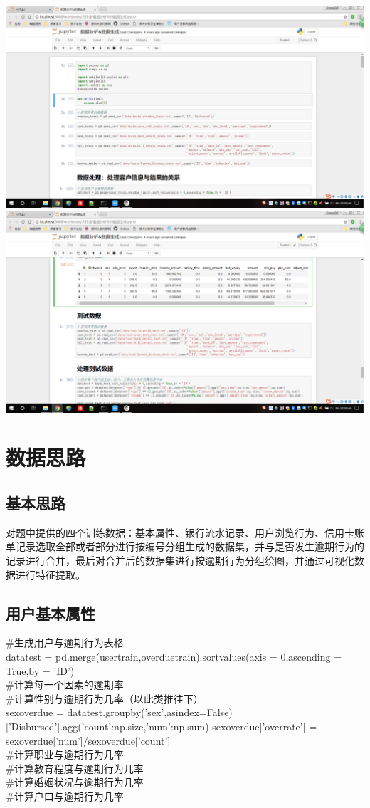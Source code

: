 \documentclass{article}
\begin{document}
\includegraphics[scale=0.3]{图一}
\includegraphics[scale=0.3]{2}

\section{数据思路}
\subsection{基本思路}
对题中提供的四个训练数据：基本属性、银行流水记录、用户浏览行为、信用卡账单记录选取全部或者部分进行按编号分组生成的数据集，并与是否发生逾期行为的记录进行合并，最后对合并后的数据集进行按逾期行为分组绘图，并通过可视化数据进行特征提取。

\subsection{用户基本属性}
\#生成用户与逾期行为表格
\\datatest = pd.merge(user\textunderscore train,overdue\textunderscore train).sort\textunderscore values(axis = 0,ascending = True,by = 'ID') 
\\ \#计算每一个因素的逾期率
\\ \#计算性别与逾期行为几率（以此类推往下）
\\ sex\textunderscore overdue = 
datatest.groupby('sex',as\textunderscore index=False)['Disbursed'].agg({'count':np.size,'num':np.sum})
sex\textunderscore overdue['over\textunderscore rate'] = sex\textunderscore overdue['num']/sex\textunderscore overdue['count']
\\ \#计算职业与逾期行为几率
\\ \#计算教育程度与逾期行为几率
\\ \#计算婚姻状况与逾期行为几率
\\ \#计算户口与逾期行为几率
\end{document}
